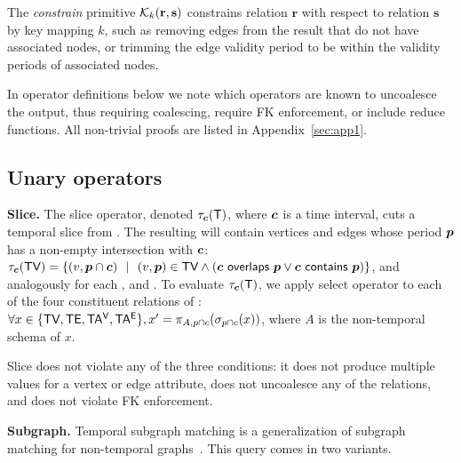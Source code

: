 The {\em constrain} primitive $\mathcal{K}_{k}(\mathbf{r},\mathbf{s})$ constrains relation
$\mathbf{r}$ with respect to relation $\mathbf{s}$ by key mapping $k$,
such as removing edges from the result that do not have associated
nodes, or trimming the edge validity period to be within the validity
periods of associated nodes.

In operator definitions below we note which operators are known to
uncoalesce the output, thus requiring coalescing, require FK
enforcement, or include reduce functions.  All non-trivial proofs are
listed in Appendix~\ref{sec:app1}.

\subsection{Unary operators}
\label{sec:algebra:unary}


{\bf Slice.}  The slice operator, denoted $\tau_{\boldsymbol{c}} (\mathsf{T})$, where
$\boldsymbol{c}$ is a time interval, cuts a temporal slice from \ttt. The
resulting \tg will contain vertices and edges whose period $\boldsymbol{p}$ has a
non-empty intersection with $\boldsymbol{c}$: $\tau_{\boldsymbol{c}} (\textsf{TV}) = \{ (v, \boldsymbol{p} \cap
\boldsymbol{c})~~|~~(v, \boldsymbol{p}) \in \textsf{TV} \wedge (\boldsymbol{c}~\mathsf{overlaps}~\boldsymbol{p} \vee
\boldsymbol{c}~\mathsf{contains}~\boldsymbol{p}) \}$, and analogously for each \te, \tav and
\tae.  To evaluate $\tau_{\boldsymbol{c}} (\mathsf{T})$, we apply select operator to
each of the four constituent relations of \tve: $\forall x \in
\{\textsf{TV},\textsf{TE},\mathsf{TA^{V}},\mathsf{TA^{E}} \}, x' = \pi_{A,p \cap c}(\sigma_{p \cap c} (x))$,
where $A$ is the non-temporal schema of $x$.


Slice does not violate any of the three conditions: it does not
produce multiple values for a vertex or edge attribute, does not
uncoalesce any of the \tve relations, and does not violate FK
enforcement.


{\bf Subgraph.}  Temporal subgraph matching is a generalization of
subgraph matching for non-temporal graphs~\cite{Wood2012}.  This query
comes in two variants.

